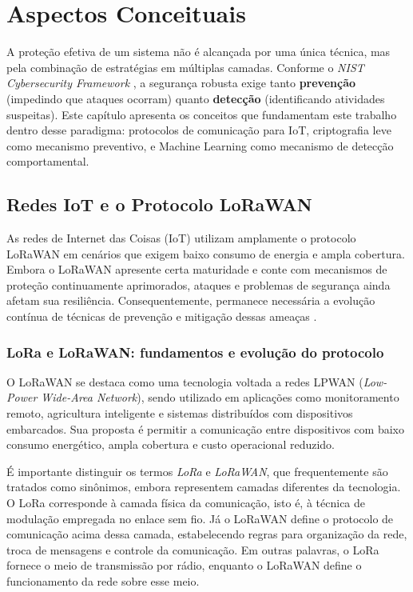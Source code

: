 \chapter{Aspectos Conceituais} \label{cap:conceitos}

A proteção efetiva de um sistema não é alcançada por uma única técnica, 
mas pela combinação de estratégias em múltiplas camadas. Conforme o 
\textit{NIST Cybersecurity Framework} \cite{nist_csf_2024}, a segurança 
robusta exige tanto \textbf{prevenção} (impedindo que ataques ocorram) 
quanto \textbf{detecção} (identificando atividades suspeitas). Este 
capítulo apresenta os conceitos que fundamentam este trabalho dentro 
desse paradigma: protocolos de comunicação para IoT, criptografia leve 
como mecanismo preventivo, e Machine Learning como mecanismo de detecção 
comportamental.

\section{Redes IoT e o Protocolo LoRaWAN}

As redes de Internet das Coisas (IoT) utilizam amplamente o protocolo LoRaWAN em cenários que exigem baixo consumo de energia e ampla cobertura. Embora o LoRaWAN apresente certa maturidade e conte com mecanismos de proteção continuamente aprimorados, ataques e problemas de segurança ainda afetam sua resiliência. Consequentemente, permanece necessária a evolução contínua de técnicas de prevenção e mitigação dessas ameaças \cite{hessel2023lorawan}.


\subsection{LoRa e LoRaWAN: fundamentos e evolução do protocolo}

O LoRaWAN se destaca como uma tecnologia voltada a redes LPWAN (\textit{Low-Power Wide-Area Network}), sendo utilizado em aplicações como monitoramento remoto, agricultura inteligente e sistemas distribuídos com dispositivos embarcados. Sua proposta é permitir a comunicação entre dispositivos com baixo consumo energético, ampla cobertura e custo operacional reduzido.

É importante distinguir os termos \textit{LoRa} e \textit{LoRaWAN}, que frequentemente são tratados como sinônimos, embora representem camadas diferentes da tecnologia. O LoRa corresponde à camada física da comunicação, isto é, à técnica de modulação empregada no enlace sem fio. Já o LoRaWAN define o protocolo de comunicação acima dessa camada, estabelecendo regras para organização da rede, troca de mensagens e controle da comunicação. Em outras palavras, o LoRa fornece o meio de transmissão por rádio, enquanto o LoRaWAN define o funcionamento da rede sobre esse meio.

